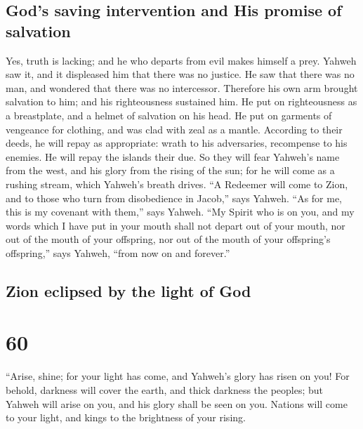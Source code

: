 \hypertarget{gods-saving-intervention-and-his-promise-of-salvation}{%
\subsection{God's saving intervention and His promise of
salvation}\label{gods-saving-intervention-and-his-promise-of-salvation}}

 Yes, truth is lacking; and he who departs from evil
makes himself a prey. Yahweh saw it, and it displeased him that there
was no justice.  He saw that there was no man, and
wondered that there was no intercessor. Therefore his own arm brought
salvation to him; and his righteousness sustained him. 
He put on righteousness as a breastplate, and a helmet of salvation on
his head. He put on garments of vengeance for clothing, and was clad
with zeal as a mantle.  According to their deeds, he will
repay as appropriate: wrath to his adversaries, recompense to his
enemies. He will repay the islands their due.  So they
will fear Yahweh's name from the west, and his glory from the rising of
the sun; for he will come as a rushing stream, which Yahweh's breath
drives.  ``A Redeemer will come to Zion, and to those who
turn from disobedience in Jacob,'' says Yahweh.  ``As for
me, this is my covenant with them,'' says Yahweh. ``My Spirit who is on
you, and my words which I have put in your mouth shall not depart out of
your mouth, nor out of the mouth of your offspring, nor out of the mouth
of your offspring's offspring,'' says Yahweh, ``from now on and
forever.''

\hypertarget{zion-eclipsed-by-the-light-of-god}{%
\subsection{Zion eclipsed by the light of
God}\label{zion-eclipsed-by-the-light-of-god}}

\hypertarget{section-59}{%
\section{60}\label{section-59}}

 ``Arise, shine; for your light has come, and Yahweh's
glory has risen on you!  For behold, darkness will cover
the earth, and thick darkness the peoples; but Yahweh will arise on you,
and his glory shall be seen on you.  Nations will come to
your light, and kings to the brightness of your rising.

